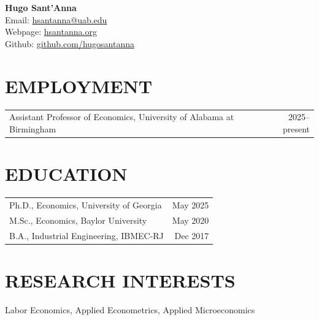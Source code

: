 \documentclass[11pt,letterpaper]{article}
\begin{document}
\thispagestyle{firstpage}

\begin{center}
    {\LARGE \textbf{Hugo Sant'Anna}} \\[6pt]
    Email: \href{mailto:hsantanna@uab.edu}{hsantanna@uab.edu} \\
    Webpage: \href{https://hsantanna.org}{hsantanna.org} \\
    Github: \href{https://github.com/hugosantanna}{github.com/hugosantanna}
\end{center}

\vspace{8pt}

\section*{EMPLOYMENT}
\begin{tabularx}{\textwidth}{Xr}
    Assistant Professor of Economics, University of Alabama at Birmingham & 2025--present \\
\end{tabularx}

\section*{EDUCATION}
\begin{tabularx}{\textwidth}{Xr}
    Ph.D., Economics, University of Georgia & May 2025 \\
    M.Sc., Economics, Baylor University & May 2020 \\
    B.A., Industrial Engineering, IBMEC-RJ & Dec 2017 \\
\end{tabularx}

\section*{RESEARCH INTERESTS}
\hspace{2em} Labor Economics, Applied Econometrics, Applied Microeconomics
\end{document}
